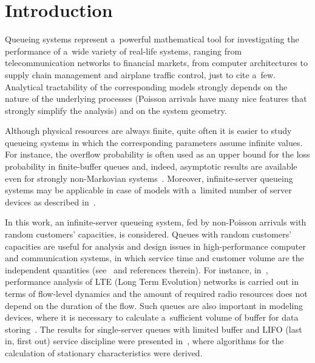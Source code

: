

\vspace*{9pt}



      \thispagestyle{myheadings}

      \begin{multicols}{2}

                  \label{st\stat}

\section{Introduction}

\noindent
Queueing systems represent a~powerful mathematical tool for investigating 
the performance of a~wide variety of real-life systems, ranging 
from telecommunication networks to financial markets, from computer 
architectures to supply chain management and airplane traffic control, 
just to cite a~few. Analytical tractability of the corresponding models 
strongly depends on the nature of the underlying processes (Poisson 
arrivals have many nice features that strongly simplify the analysis) 
and on the system geometry.

Although physical resources are always finite, quite often it is easier 
to study queueing systems in which the corresponding parameters assume 
infinite values. For instance, the overflow probability is often used 
as an upper bound for the loss probability in finite-buffer queues and, 
indeed, asymptotic results are available even for strongly non-Markovian 
systems~\cite{mandjes}. Moreover, infinite-server queueing systems may be 
applicable in case of models with a~limited number of server devices 
as described in~\cite{lit2}.

In this work,  an infinite-server queueing system, fed by 
non-Poisson arrivals with random customers' capacities, is considered.  
Queues with random customers' capacities are  useful for analysis 
and design issues in high-performance computer and communication systems, 
in which service time and customer volume are the independent quantities 
(see~\cite{lit8, lit10} and references therein). For instance, in~\cite{lit10}, 
performance analysis of LTE (Long Term Evolution) networks is carried out 
in terms of flow-level dynamics and the amount of required radio resources 
does not depend on the duration of the flow. Such queues are also important in 
modeling devices, where it is necessary to calculate a~sufficient volume of buffer 
for data storing~\cite{lit9, lit12}.
The results for single-server queues with limited buffer and LIFO 
(last in, first out) service discipline 
were presented in~\cite{lit13}, where algorithms for the calculation of stationary 
characteristics were derived. 


\end{multicols}
